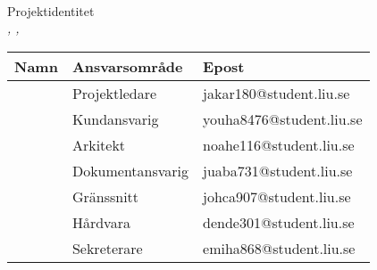 \documentclass[kravspec/krav.tex]{subfiles}
\newenvironment{projektidentitet}{%
{\ }\vspace{30mm}
\renewcommand{\arraystretch}{2}
\begin{center}
  {\huge Projektidentitet\\[1ex]}
  \textsl{\VARgruppnummer, \LIPSdatum, \VARprojekttitel}\\[1cm]
    \begin{tabular}{lp{60mm}l}
      \hline
      \textbf{Namn} &
      \textbf{Ansvarsområde} &
      \textbf{Epost} \\
	\hline
      }%
      {%
      \hline
    \end{tabular}
\end{center}
}
\newcommand{\gruppmedlem}[3]{{#1} & {#2} & {#3} \\}
\begin{document}
\thispagestyle{empty}

\begin{projektidentitet}
\gruppmedlem{\VARprojektledare}{Projektledare}{jakar180@student.liu.se}
\gruppmedlem{\VARkundansvarig}{Kundansvarig}{youha8476@student.liu.se}
\gruppmedlem{\VARarkitekt}{Arkitekt}{noahe116@student.liu.se}
\gruppmedlem{\VARdokumentansvarig}{Dokumentansvarig}{juaba731@student.liu.se}
\gruppmedlem{\VARgranssnitt}{Gränssnitt}{johca907@student.liu.se}
\gruppmedlem{\VARhardware}{Hårdvara}{dende301@student.liu.se}
\gruppmedlem{\VARsekreterare}{Sekreterare}{emiha868@student.liu.se}
\end{projektidentitet}

\newpage
\end{document}
